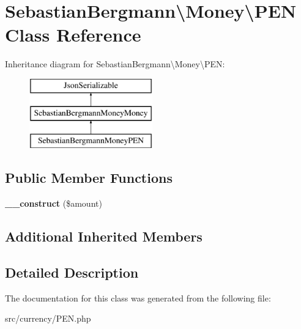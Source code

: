 \hypertarget{classSebastianBergmann_1_1Money_1_1PEN}{}\section{Sebastian\+Bergmann\textbackslash{}Money\textbackslash{}P\+E\+N Class Reference}
\label{classSebastianBergmann_1_1Money_1_1PEN}
Inheritance diagram for Sebastian\+Bergmann\textbackslash{}Money\textbackslash{}P\+E\+N\+:\begin{figure}[H]
\begin{center}
\leavevmode
\includegraphics[height=3.000000cm]{classSebastianBergmann_1_1Money_1_1PEN}
\end{center}
\end{figure}
\subsection*{Public Member Functions}
\begin{DoxyCompactItemize}
\item 
\hypertarget{classSebastianBergmann_1_1Money_1_1PEN_a5598231eb652786ec34d8e4d27c4f129}{}{\bfseries \+\_\+\+\_\+construct} (\$amount)\label{classSebastianBergmann_1_1Money_1_1PEN_a5598231eb652786ec34d8e4d27c4f129}

\end{DoxyCompactItemize}
\subsection*{Additional Inherited Members}


\subsection{Detailed Description}


The documentation for this class was generated from the following file\+:\begin{DoxyCompactItemize}
\item 
src/currency/P\+E\+N.\+php\end{DoxyCompactItemize}
